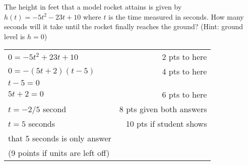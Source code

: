 {
	The height in feet that a model rocket attains is given by $h(t)=-5t^2-23t+10$ where $t$  is the time measured in seconds. How many seconds will it take until the rocket finally reaches the ground? (Hint: ground level is $h=0$)
}
{
	\begin{tabular}{l r}
	$0=-5t^2+23t+10$ &		2 pts to here\\
	$0=-(5t+2)(t-5)$ &		4 pts to here\\
	$t-5=0$			\\
	$5t+2=0$			& 6 pts to here\\
	$t=-2/5$ second	&		8 pts given both answers\\
	$t=5$ seconds	&		10 pts if student shows\\
	that 5 seconds is only answer\\
	(9 points if units are left off)
	\end{tabular}
}
